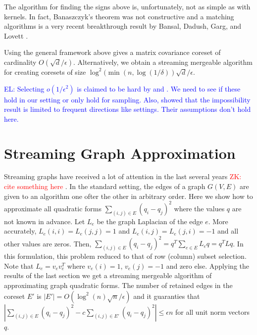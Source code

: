 \documentclass[anon,12pt]{colt2019} %
\newcommand{\zk}[1]{\textcolor{red}{ZK: #1}}
\newcommand{\el}[1]{\textcolor{blue}{EL: #1}}
\newcommand{\eps}{\epsilon}
\begin{document}
The algorithm for finding the signs above is, unfortunately, not as simple as with kernels. 
In fact, Banaszczyk's theorem was not constructive and a matching algorithms is a very recent breakthrough result by Bansal, Dadush, Garg, and Lovett \cite{DBLP:conf/stoc/BansalDGL18}.

Using the general framework above gives a matrix covariance coreset of cardinality $O(\sqrt{d}/\eps)$.
Alternatively, we obtain a streaming mergeable algorithm for creating coresets of size $\log^{2}(\min(n, \log(1/\delta)) \sqrt{d}/\eps$.



\el{Selecting $o(1/\eps^2)$ is claimed to be hard by \cite{DBLP:conf/focs/DeshpandeR10} and \cite{DBLP:conf/soda/DeshpandeRVW06}. We need to see if these hold in our setting or only hold for sampling.  Also, \cite{DBLP:conf/soda/GhashamiP14} showed that the impossibility result is limited to frequent directions like settings. Their assumptions don't hold here.} 

\section{Streaming Graph Approximation}
Streaming graphs have received a lot of attention in the last several years \zk{cite something here \cite{}}. 
In the standard setting, the edges of a graph $G(V,E)$ are given to an algorithm one ofter the other in arbitrary order.
Here we show how to approximate all quadratic forms $\sum_{(i,j) \in E} (q_i - q_j)^2$ where the values $q$ are not known in advance.
Let $L_e$ be the graph Laplacian of the edge $e$. More accurately, $L_e(i,i) = L_e(j,j) = 1$ and  $L_e(i,j) = L_e(j,i) = -1$ and all other values are zeros.
Then, $\sum_{(i,j) \in E} (q_i - q_j)^2 = q^T \sum_{e \in E}L_e q = q^T L q$. 
In this formulation, this problem reduced to that of row (column) subset selection. 
Note that $L_e = v_ev_e^T$ where $v_e(i) = 1$, $v_e(j)=-1$ and zero else.
Applying the results of the last section we get a streaming mergeable algorithm of approximating graph quadratic forms.
The number of retained edges in the coreset $E'$ is $|E'| = O(\log^{2}(n) \sqrt{n}/\eps)$ and it guaranties that 
$|\sum_{(i,j) \in E} (q_i - q_j)^2  - c \sum_{(i,j) \in E'} (q_i - q_j)^2| \le \eps n$ for all unit norm vectors $q$.
\end{document}
